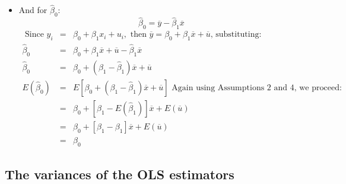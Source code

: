 \documentclass[11pt]{article}
\begin{document}
\begin{itemize}
\item And for $\widehat{\beta }_{0}:$%
\begin{equation*}
\widehat{\beta }_{0}=\overline{y}-\widehat{\beta }_{1}\overline{x}
\end{equation*}%
\begin{eqnarray*}
\text{ Since }y_{i} &=&\beta _{0}+\beta _{1}x_{i}+u_{i},\text{ then }%
\overline{y}=\beta _{0}+\beta _{1}\overline{x}+\overline{u}\text{,
substituting:} \\
\widehat{\beta }_{0} &=&\beta _{0}+\beta _{1}\overline{x}+\overline{u}-%
\widehat{\beta }_{1}\overline{x} \\
\widehat{\beta }_{0} &=&\beta _{0}+\left( \beta _{1}-\widehat{\beta }%
_{1}\right) \overline{x}+\overline{u} \\
E\left( \widehat{\beta }_{0}\right) &=&E\left[ \beta _{0}+\left( \beta _{1}-%
\widehat{\beta }_{1}\right) \overline{x}+\overline{u}\right] \text{ \ Again
using Assumptions 2 and 4, we proceed:} \\
&=&\beta _{0}+\left[ \beta _{1}-E\left( \widehat{\beta }_{1}\right) \right] 
\overline{x}+E\left( \overline{u}\right) \text{ \ } \\
&=&\beta _{0}+\left[ \beta _{1}-\beta _{1}\right] \overline{x}+E\left( 
\overline{u}\right) \text{ \ \ } \\
&=&\beta _{0}\text{ \ \ }
\end{eqnarray*}
\end{itemize}

\subsection{The variances of the OLS estimators}
\end{document}
